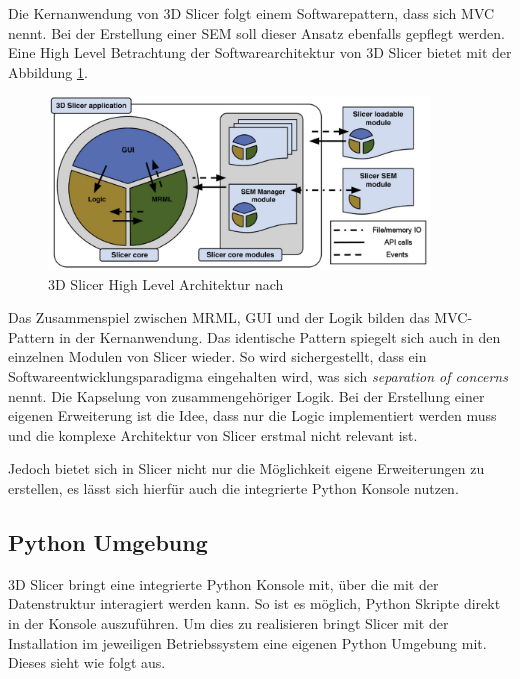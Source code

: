 Die Kernanwendung von 3D Slicer folgt einem Softwarepattern, dass sich \ac{MVC} nennt.
Bei der Erstellung einer \ac{SEM} soll dieser Ansatz ebenfalls gepflegt werden.
Eine High Level Betrachtung der Softwarearchitektur von 3D Slicer bietet
\cite[Seite 1332]{fedorov2012slicer} mit der Abbildung
\ref{fig:3d_slicer_architektur}.

\begin{figure}[h]
	\centering
	\includegraphics[width=0.9\textwidth]{img/3d_slicer_architektur.jpg}
	\caption{3D Slicer High Level Architektur nach \citet[S.~25]{fedorov2012slicer}}
	\label{fig:3d_slicer_architektur}
\end{figure}

Das Zusammenspiel zwischen \ac{MRML}, \ac{GUI} und der Logik bilden das MVC-Pattern
in der Kernanwendung. Das identische Pattern spiegelt sich auch in den einzelnen
Modulen von Slicer wieder. So wird sichergestellt, dass ein Softwareentwicklungsparadigma
eingehalten wird, was sich \textit{separation of concerns} nennt. Die Kapselung
von zusammengehöriger Logik. Bei der Erstellung einer eigenen Erweiterung ist die
Idee, dass nur die Logic implementiert werden muss und die komplexe Architektur
von Slicer erstmal nicht relevant ist.

Jedoch bietet sich in Slicer nicht nur die Möglichkeit eigene Erweiterungen zu
erstellen, es lässt sich hierfür auch die integrierte Python Konsole nutzen.

\subsection{Python Umgebung}
\label{subsec:pythob_umgebung} 3D Slicer bringt eine integrierte Python Konsole mit,
über die mit der Datenstruktur interagiert werden kann. So ist es möglich,
Python Skripte direkt in der Konsole auszuführen. Um dies zu realisieren bringt Slicer
mit der Installation im jeweiligen Betriebssystem eine eigenen Python Umgebung mit.
Dieses sieht wie folgt aus.

